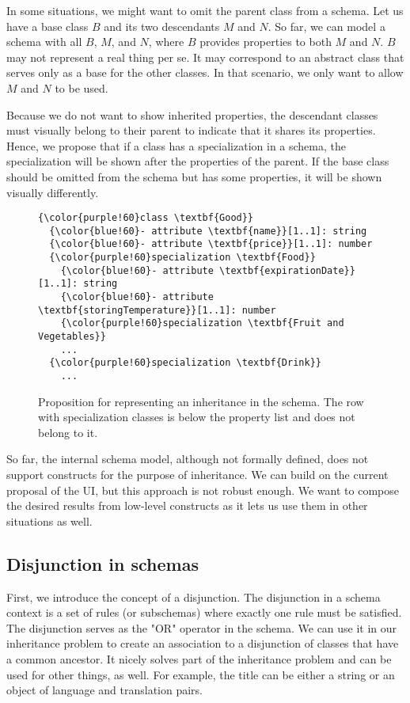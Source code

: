 In some situations, we might want to omit the parent class from a schema. Let us have a base class $B$ and its two descendants $M$ and $N$. So far, we can model a schema with all $B$, $M$, and $N$, where $B$ provides properties to both $M$ and $N$. $B$ may not represent a real thing per se. It may correspond to an abstract class that serves only as a base for the other classes. In that scenario, we only want to allow $M$ and $N$ to be used.

\medskip

Because we do not want to show inherited properties, the descendant classes must visually belong to their parent to indicate that it shares its properties. Hence, we propose that if a class has a specialization in a schema, the specialization will be shown after the properties of the parent. If the base class should be omitted from the schema but has some properties, it will be shown visually differently.

\begin{figure}[h!]\centering
  \begin{Verbatim}[commandchars=\\\{\}]
{\color{purple!60}class \textbf{Good}}
  {\color{blue!60}- attribute \textbf{name}}[1..1]: string
  {\color{blue!60}- attribute \textbf{price}}[1..1]: number
  {\color{purple!60}specialization \textbf{Food}}
    {\color{blue!60}- attribute \textbf{expirationDate}}[1..1]: string
    {\color{blue!60}- attribute \textbf{storingTemperature}}[1..1]: number
    {\color{purple!60}specialization \textbf{Fruit and Vegetables}}
    ...
  {\color{purple!60}specialization \textbf{Drink}}
    ...
\end{Verbatim}
  \caption{Proposition for representing an inheritance in the schema. The row with specialization classes is below the property list and does not belong to it.}
\end{figure}

So far, the internal schema model, although not formally defined, does not support constructs for the purpose of inheritance. We can build on the current proposal of the UI, but this approach is not robust enough. We want to compose the desired results from low-level constructs as it lets us use them in other situations as well.

\subsection{Disjunction in schemas}

First, we introduce the concept of a disjunction. The disjunction in a schema context is a set of rules (or subschemas) where exactly one rule must be satisfied. The disjunction serves as the "OR" operator in the schema. We can use it in our inheritance problem to create an association to a disjunction of classes that have a common ancestor. It nicely solves part of the inheritance problem and can be used for other things, as well. For example, the title can be either a string or an object of language and translation pairs.

